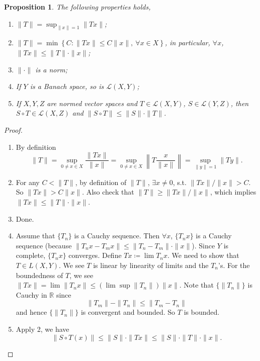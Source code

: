 \documentclass[12pt]{article}
\theoremstyle{plain}
\newtheorem*{prop}{Proposition}
\theoremstyle{definition}
\begin{document}
\begin{prop} The following properties holds,
    \begin{enumerate}
        \item $\|T\| = \sup_{\|x\|=1} \|Tx\|$;
        \item $\|T\| = \min\left\{ C:\|Tx\|\leq C\|x\|,\ \forall x\in X\right\}$, in particular, $\forall x$,
            $\|Tx\|\leq \|T\|\cdot\|x\|$;
        \item $\|\cdot\|$ is a norm;
        \item If $Y$ is a Banach space, so is $\mathcal{L}(X,Y)$;
        \item If $X, Y, Z$ are normed vector spaces and $T\in \mathcal{L}(X,Y)$, $S\in \mathcal{L}(Y,Z)$, then $S\circ T\in \mathcal{L}(X,Z)$ and
            $\|S\circ T\| \leq \|S\|\cdot \|T\|$.
    \end{enumerate}
\end{prop}
\begin{proof}
    \begin{enumerate}
        \item By definition
            \[
                \|T\| = \sup_{0\neq x\in X}\frac{\|Tx\|}{\|x\|} = \sup_{0\neq x\in X}\left\|T\frac{x}{\|x\|}\right\| =
                \sup_{\|y\|=1}\|Ty\|.
            \]
        \item 
            For any $C<\|T\|$, by definition of $\|T\|$, $\exists x\neq 0$, s.t. $\|Tx\|/\|x\| > C$.
            So $\|Tx\| > C\|x\|$.
            Also check that $\|T\|\geq \|Tx\|/\|x\|$, which implies $\|Tx\|\leq \|T\|\cdot\|x\|$.
        \item Done.
        \item Assume that $\{T_n\}$ is a Cauchy sequence.
            Then $\forall x$, $\{T_nx\}$ is a Cauchy sequence (because $\|T_n x - T_m x\| \leq \|T_n - T_m\|\cdot
            \|x\|$).
            Since $Y$ is complete, $\{T_nx\}$ converges.
            Define $Tx\coloneqq \lim T_nx$.
            We need to show that $T\in L(X,Y)$.
            We see $T$ is linear by linearity of limits and the $T_n$'s.
            For the boundedness of $T$,
            we see $\|Tx\| = \lim \|T_n x\| \leq (\lim\sup \|T_n\|)\|x\|$.
            Note that $\{\|T_n\|\}$ is Cauchy in $\mathbb{R}$ since
            \[
                \|T_m\| - \|T_n\| \leq \|T_m-T_n\|
            \]
            and hence $\{\|T_n\|\}$ is convergent and bounded.
            So $T$ is bounded.
        \item
            Apply 2, we have
            \[
                \|S\circ T(x)\| \leq \|S\|\cdot \|Tx\| \leq \|S\|\cdot \|T\|\cdot \|x\|.
            \]
    \end{enumerate}
\end{proof}
\end{document}
